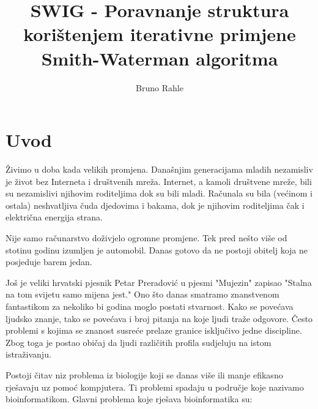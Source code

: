 \documentclass[times, utf8, zavrsni]{fer}
\begin{document}

\title{SWIG - Poravnanje struktura korištenjem iterativne primjene Smith-Waterman algoritma}

\author{Bruno Rahle}

\maketitle

\izvornik

\zahvala{}

\tableofcontents

\listoffigures

\listoftables

\chapter{Uvod}
Živimo u doba kada velikih promjena. Današnjim generacijama mladih nezamisliv
je život bez Interneta i društvenih mreža. Internet, a kamoli društvene mreže,
bili su nezamislivi njihovim roditeljima dok su bili mladi. Računala
su bila (većinom i ostala) neshvatljiva čuda djedovima i bakama, dok
je njihovim roditeljima čak i električna energija strana. 

Nije samo računarstvo doživjelo ogromne promjene. Tek pred nešto više od 
stotinu godinu izumljen je automobil. Danas gotovo da ne postoji obitelj
koja ne posjeduje barem jedan. 

Još je veliki hrvatski pjesnik Petar Preradović u pjesmi "Mujezin" %
zapisao "Stalna na tom svijetu samo mijena jest." Ono što danas smatramo
znanstvenom fantastikom za nekoliko bi godina moglo postati stvarnost. 
Kako se povećava ljudsko znanje, tako se povećava i broj pitanja na 
koje ljudi traže odgovore. Često problemi s kojima se znanost 
susreće prelaze granice isključivo jedne discipline. Zbog toga je postao
običaj da ljudi različitih profila sudjeluju na istom
istraživanju. 


Postoji čitav niz problema iz biologije koji se danas više ili manje efikasno
rješavaju uz pomoć kompjutera. Ti problemi spadaju u područje koje nazivamo
bioinformatikom. Glavni problema koje rješava bioinformatika su:
\end{document}
